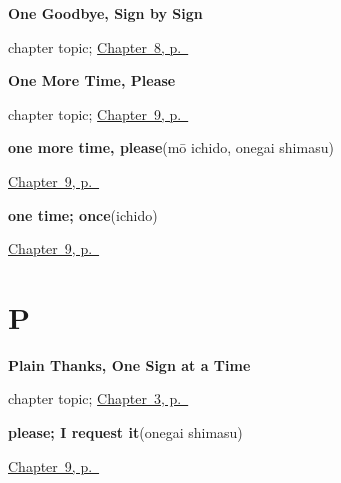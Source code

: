 \noindent\begin{minipage}[t]{\linewidth}
\raggedright
\textbf{One Goodbye, Sign by Sign}\par
\footnotesize chapter topic; \hyperref[ch:ja-sayounara]{Chapter~8, p.~\pageref*{ch:ja-sayounara}}
\end{minipage}\par\smallskip

\noindent\begin{minipage}[t]{\linewidth}
\raggedright
\textbf{One More Time, Please}\par
\footnotesize chapter topic; \hyperref[ch:ja-repeat-please]{Chapter~9, p.~\pageref*{ch:ja-repeat-please}}
\end{minipage}\par\smallskip

\noindent\begin{minipage}[t]{\linewidth}
\raggedright
\textbf{one more time, please}\enspace\emph{}\enspace(mō ichido, onegai shimasu)\par
\footnotesize \hyperref[ch:ja-repeat-please]{Chapter~9, p.~\pageref*{ch:ja-repeat-please}}
\end{minipage}\par\smallskip

\noindent\begin{minipage}[t]{\linewidth}
\raggedright
\textbf{one time; once}\enspace\emph{}\enspace(ichido)\par
\footnotesize \hyperref[ch:ja-repeat-please]{Chapter~9, p.~\pageref*{ch:ja-repeat-please}}
\end{minipage}\par\smallskip

\section*{P}

\noindent\begin{minipage}[t]{\linewidth}
\raggedright
\textbf{Plain Thanks, One Sign at a Time}\par
\footnotesize chapter topic; \hyperref[ch:ja-plain-thanks]{Chapter~3, p.~\pageref*{ch:ja-plain-thanks}}
\end{minipage}\par\smallskip

\noindent\begin{minipage}[t]{\linewidth}
\raggedright
\textbf{please; I request it}\enspace\emph{}\enspace(onegai shimasu)\par
\footnotesize \hyperref[ch:ja-repeat-please]{Chapter~9, p.~\pageref*{ch:ja-repeat-please}}
\end{minipage}\par\smallskip

